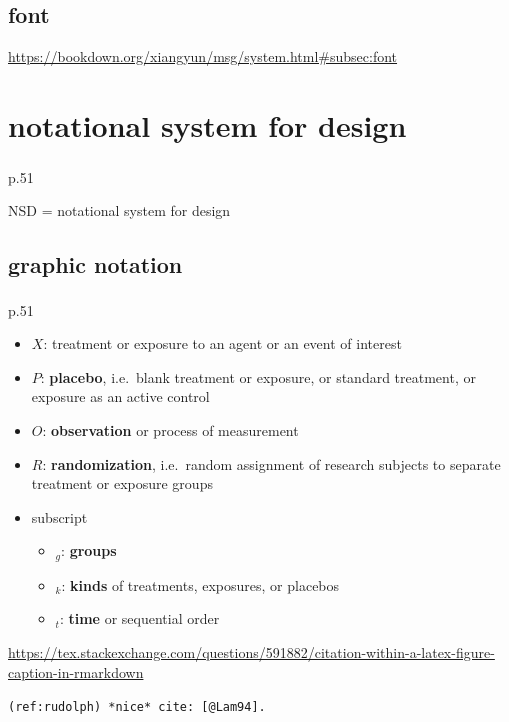 \documentclass[
]{book}
\providecommand{\tightlist}{%
  \setlength{\itemsep}{0pt}\setlength{\parskip}{0pt}}
\theoremstyle{definition}
\theoremstyle{definition}
\theoremstyle{definition}
\theoremstyle{definition}
\theoremstyle{remark}
\begin{document}
\section{font}\label{font}

\url{https://bookdown.org/xiangyun/msg/system.html\#subsec:font}

\chapter{notational system for design}\label{notational-system-for-design}

\textsuperscript{} p.51

NSD = notational system for design

\textsuperscript{}

\section{graphic notation}\label{graphic-notation}

\textsuperscript{} p.51

\begin{itemize}
\tightlist
\item
  \(X\): treatment or exposure to an agent or an event of interest
\item
  \(P\): \textbf{placebo}, i.e.~blank treatment or exposure, or standard treatment, or exposure as an active control
\item
  \(O\): \textbf{observation} or process of measurement
\item
  \(R\): \textbf{randomization}, i.e.~random assignment of research subjects to separate treatment or exposure groups
\item
  subscript

  \begin{itemize}
  \tightlist
  \item
    \(_g\): \textbf{groups}
  \item
    \(_k\): \textbf{kinds} of treatments, exposures, or placebos
  \item
    \(_t\): \textbf{time} or sequential order
  \end{itemize}
\end{itemize}

\url{https://tex.stackexchange.com/questions/591882/citation-within-a-latex-figure-caption-in-rmarkdown}

\texttt{(ref:rudolph)\ *nice*\ cite:\ {[}@Lam94{]}.}
\end{document}
